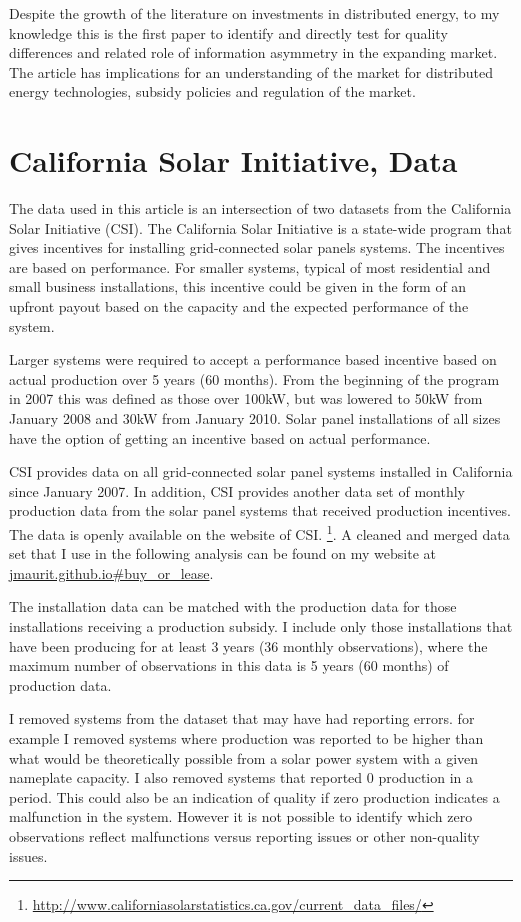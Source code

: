 \documentclass[a4paper]{article}
\begin{document}
Despite the growth of the literature on investments in distributed energy, to my knowledge this is the first paper to identify and directly test for quality differences and related role of information asymmetry in the expanding market. The article has implications for an understanding of the market for distributed energy technologies, subsidy policies and regulation of the market.

\section{California Solar Initiative, Data}

The data used in this article is an intersection of two datasets from the California Solar Initiative (CSI). The California Solar Initiative is a state-wide program that gives incentives for installing grid-connected solar panels systems. The incentives are based on performance. For smaller systems, typical of most residential and small business installations, this incentive could be given in the form of an upfront payout based on the capacity and the expected performance of the system.

Larger systems were required to accept a performance based incentive based on actual production over 5 years (60 months). From the beginning of the program in 2007 this was defined as those over 100kW, but was lowered to 50kW from January 2008 and 30kW from January 2010. Solar panel installations of all sizes have the option of getting an incentive based on actual performance.

CSI provides data on all grid-connected solar panel systems installed in California since January 2007. In addition, CSI provides another data set of monthly production data from the solar panel systems that received production incentives. The data is openly available on the website of CSI. \footnote{\url{http://www.californiasolarstatistics.ca.gov/current_data_files/}}. A cleaned and merged data set that I use in the following analysis can be found on my website at \url{jmaurit.github.io#buy_or_lease}.

The installation data can be matched with the production data for those installations receiving a production subsidy. I include only those installations that have been producing for at least 3 years (36 monthly observations), where the maximum number of observations in this data is 5 years (60 months) of production data.

I removed systems from the dataset that may have had reporting errors. for example I removed systems where production was reported to be higher than what would be theoretically possible from a solar power system with a given nameplate capacity. I also removed systems that reported 0 production in a period. This could also be an indication of quality if zero production indicates a malfunction in the system. However it is not possible to identify which zero observations reflect malfunctions versus reporting issues or other non-quality issues.
\end{document}

